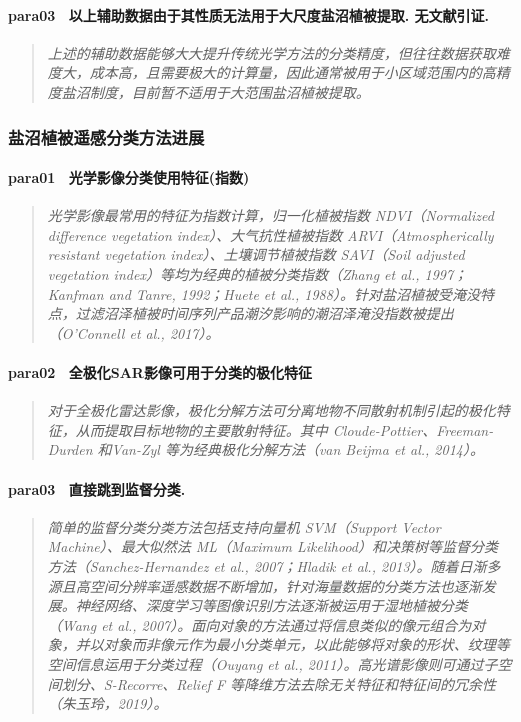\paragraph*{para03~
    \textcolor[RGB]{17, 205, 29}{以上辅助数据由于其性质无法用于大尺度盐沼植被提取. 无文献引证. }}
\begin{quotation}
    \itshape
    上述的辅助数据能够大大提升传统光学方法的分类精度，但往往数据获取难度大，成本高，且需要极大的计算量，因此通常被用于小区域范围内的高精度盐沼制度，目前暂不适用于大范围盐沼植被提取。 
\end{quotation}


\subsubsection{盐沼植被遥感分类方法进展}

\paragraph*{para01~
    \textcolor[RGB]{17, 205, 29}{光学影像分类使用特征(指数)}}
\begin{quotation}
    \itshape
    光学影像最常用的特征为指数计算，归一化植被指数 NDVI（Normalized difference vegetation index）、大气抗性植被指数 ARVI（Atmospherically resistant vegetation index）、土壤调节植被指数 SAVI（Soil adjusted vegetation index）等均为经典的植被分类指数（Zhang et al., 1997；Kanfman and Tanre, 1992；Huete et al., 1988）。针对盐沼植被受淹没特点，过滤沼泽植被时间序列产品潮汐影响的潮沼泽淹没指数被提出（O’Connell et al., 2017）。
\end{quotation}

\paragraph*{para02~
    \textcolor[RGB]{17, 205, 29}{全极化SAR影像可用于分类的极化特征}}
\begin{quotation}
    \itshape
    对于全极化雷达影像，极化分解方法可分离地物不同散射机制引起的极化特征，从而提取目标地物的主要散射特征。其中  Cloude-Pottier、Freeman-Durden 和Van-Zyl 等为经典极化分解方法（van Beijma et al., 2014）。
\end{quotation}

\paragraph*{para03~
    \textcolor[RGB]{17, 205, 29}{直接跳到监督分类.}}
\begin{quotation}
    \itshape
    简单的监督分类分类方法包括支持向量机 SVM（Support Vector Machine）、最大似然法 ML（Maximum  Likelihood）和决策树等监督分类方法（Sanchez-Hernandez et al., 2007；Hladik et al., 2013）。随着日渐多源且高空间分辨率遥感数据不断增加，针对海量数据的分类方法也逐渐发展。神经网络、深度学习等图像识别方法逐渐被运用于湿地植被分类（Wang et al., 2007）。面向对象的方法通过将信息类似的像元组合为对象，并以对象而非像元作为最小分类单元，以此能够将对象的形状、纹理等空间信息运用于分类过程（Ouyang et al., 2011）。高光谱影像则可通过子空间划分、S-Recorre、Relief F 等降维方法去除无关特征和特征间的冗余性（朱玉玲，2019）。
\end{quotation}

